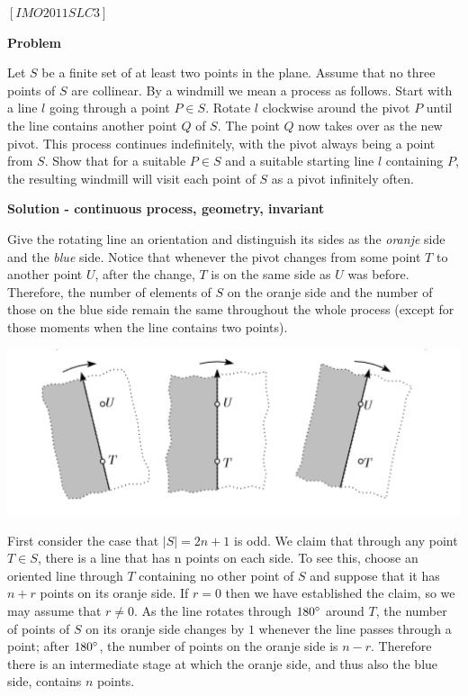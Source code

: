 \begin{problem}
$[IMO2011SLC3]$

\textbf{Problem}

Let $S$ be a ﬁnite set of at least two points in the plane. Assume that no three points of $S$ are collinear. By a windmill we mean a process as follows. Start with a line $l$ going through a point $P \in S$. Rotate $l$ clockwise around the pivot $P$ until the line contains another point $Q$ of $S$. The point $Q$ now takes over as the new pivot. This process continues indeﬁnitely, with the pivot always being a point from $S$. Show that for a suitable $P \in S$ and a suitable starting line $l$ containing $P$, the resulting windmill will visit each point of $S$ as a pivot inﬁnitely often.

\textbf{Solution - continuous process, geometry, invariant}

Give the rotating line an orientation and distinguish its sides as the \textit{oranje} side and the \textit{blue} side. Notice that whenever the pivot changes from some point $T$ to another point $U$, after the change, $T$ is on the same side as $U$ was before. Therefore, the number of elements of $S$ on the oranje side and the number of those on the blue side remain the same throughout the whole process (except for those moments when the line contains two points).

\begin{center}
\includegraphics[width=18cm]{windmill.png}
\label{fig:windmill}
\end{center}

First consider the case that $|S| = 2n + 1$ is odd. We claim that through any point $T \in S$, there is a line that has n points on each side. To see this, choose an oriented line through $T$ containing no other point of $S$ and suppose that it has $n + r$ points on its oranje side. If $r = 0$ then we have established the claim, so we may assume that $r \ne 0$. As the line rotates through $180\degree$ around $T$, the number of points of $S$ on its oranje side changes by $1$ whenever the line passes through a point; after $180\degree$, the number of points on the oranje side is $n−r$. Therefore there is an intermediate stage at which the oranje side, and thus also the blue side, contains $n$ points.


\end{problem}
